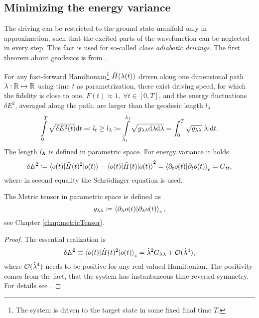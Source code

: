 \subsection{Minimizing the energy variance}
The driving can be restricted to the ground state manifold only in approximation, such that the excited parts of the wavefunction can be neglected in every step. This fact is used for so-called \emph{close adiabatic drivings}. The first theorem about geodesics is from \citet{Bukov2019}.

\begin{thm}
    \label{thm:polkovnikov}
    For any fast-forward Hamiltonian\footnote{The system is driven to the target state in some fixed final time $T$.} $\hat{H}(\lambda(t))$ driven along one dimensional path $\lambda: \mathbb{R}\mapsto \mathbb{R}$ using time $t$ as parametrization, there exist driving speed, for which the fidelity is close to one, $F(t)\approx 1, \;\forall t\in[0,T]$, and the energy fluctuations $\delta E^2$, averaged along the path, are larger than the geodesic length $l_\lambda$
    \begin{equation}
        \int\limits_0^{T}\sqrt{\delta E^2(t)}\mathrm{d} t \eqqcolon l_t\geq l_\lambda \coloneqq \int\limits_{\lambda_i}^{\lambda_f} \sqrt{g_{\lambda\lambda}\mathrm{d} \lambda\mathrm{d} \lambda} =\int_0^{T} \sqrt{g_{\lambda\lambda}}|\dot \lambda|\mathrm{d} t.
    \end{equation}
    The length $l_{\bm\lambda}$ is defined in parametric space. For energy variance it holds
    \begin{equation}
        \delta E^2\coloneqq \braket{o(t)|\hat{H}(t)^2|o(t)}-\braket{o(t)|\hat{H}(t)|o(t)}^2=\braket{\partial_t  o(t)|\partial_t o(t)}_c=G_{tt},
    \end{equation}    
    where in second equality the Schr\"odinger equation is used. 
    
    The Metric tensor in parametric space is defined as
    \begin{equation}
        g_{\lambda\lambda}\coloneqq \braket{\partial_\lambda o(t)|\partial_\lambda o(t)}_c,
    \end{equation}
    see Chapter \ref{chap:metricTensor}.
\end{thm}


\begin{proof}
    The essential realization is
    \begin{equation}
        \delta E^2\equiv \braket{o(t)|\hat{H}(t)^2|o(t)}_c=\dot\lambda^2 G_{\lambda\lambda}+\mathcal{O}(\dot\lambda^4),
    \end{equation}
    where $\mathcal{O}(\dot\lambda^4)$ needs to be positive for any real-valued Hamiltonian. The positivity comes from the fact, that the system has instantaneous time-reversal symmetry. For details see \citet{Bukov2019}.
\end{proof}


